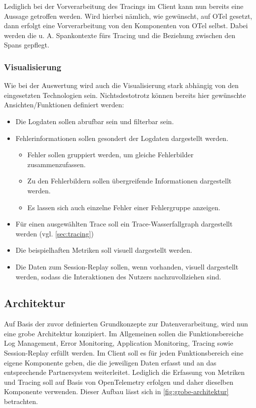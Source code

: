 	Lediglich bei der Vorverarbeitung des Tracings im Client kann nun bereits eine Aussage getroffen werden. Wird hierbei nämlich, wie gewünscht, auf OTel gesetzt, dann erfolgt eine Vorverarbeitung von den Komponenten von OTel selbst. Dabei werden die u. A. Spankontexte fürs Tracing und die Beziehung zwischen den Spans gepflegt.
		
	\subsubsection{Visualisierung}
		
	Wie bei der Auswertung wird auch die Visualisierung stark abhängig von den eingesetzten Technologien sein. Nichtsdestotrotz können bereits hier gewünschte Ansichten/Funktionen definiert werden:
		
	\begin{itemize}
		\item Die Logdaten sollen abrufbar sein und filterbar sein.
		\item Fehlerinformationen sollen gesondert der Logdaten dargestellt werden.
		\begin{itemize}
			\item Fehler sollen gruppiert werden, um gleiche Fehlerbilder zusammenzufassen.
			\item Zu den Fehlerbildern sollen übergreifende Informationen dargestellt werden.
			\item Es lassen sich auch einzelne Fehler einer Fehlergruppe anzeigen.
		\end{itemize}
		\item Für einen ausgewählten Trace soll ein Trace-Wasserfallgraph dargestellt werden (vgl. \autoref{sec:tracing})
		\item Die beispielhaften Metriken soll visuell dargestellt werden.
		\item Die Daten zum Session-Replay sollen, wenn vorhanden, visuell dargestellt werden, sodass die Interaktionen des Nutzers nachzuvollziehen sind.
	\end{itemize}
	
	\subsection{Architektur}

	Auf Basis der zuvor definierten Grundkonzepte zur Datenverarbeitung, wird nun eine grobe Architektur konzipiert. Im Allgemeinen sollen die Funktionsbereiche Log Management, Error Monitoring, Application Monitoring, Tracing sowie Session-Replay erfüllt werden. Im Client soll es für jeden Funktionsbereich eine eigene Komponente geben, die die jeweiligen Daten erfasst und an das entsprechende Partnersystem weiterleitet. Lediglich die Erfassung von Metriken und Tracing soll auf Basis von OpenTelemetry erfolgen und daher dieselben Komponente verwenden. Dieser Aufbau lässt sich in \autoref{fig:grobe-architektur} betrachten.
	
